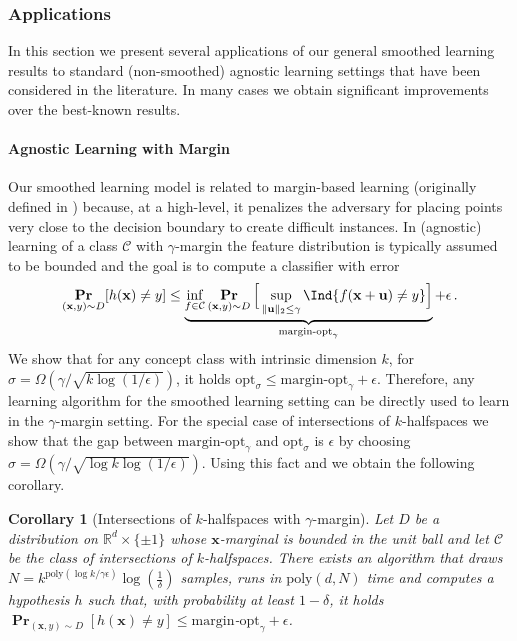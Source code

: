 \documentclass[10pt,a4paper]{article}
\newtheorem{corollary}{Corollary}[section]
\renewcommand\vec[1]{\mathbf{#1}}
\DeclareMathOperator*{\pr}{\mathbf{Pr}}
\newcommand{\R}{\mathbb{R}}
\newcommand{\eps}{\epsilon}
\newcommand{\poly}{\mathrm{poly}}
\newcommand{\1}{\Ind}
\newcommand{\smoothopt}{\mathrm{opt}_{\sigma}}
\newcommand{\x}{\vec x}
\begin{document}
\subsubsection{Applications}
In this section we present several applications of our general smoothed learning results to standard (non-smoothed) agnostic learning settings that have been considered in the literature. 
In many cases we obtain significant improvements over the best-known results.

\paragraph{Agnostic Learning with Margin}
Our smoothed learning model is related to margin-based learning (originally defined in \cite{BS00}) because, at a high-level, it
penalizes the adversary for placing points very close to the decision boundary to create
difficult instances.  In (agnostic) learning of a class $\mathcal C$ with $\gamma$-margin 
the feature distribution is typically assumed to be bounded and the goal is to compute a classifier with error 
\begin{equation}
\label{eq:margin-opt}
\pr_{(\x,y) \sim D}[h(\x) \neq y] \leq 
\underbrace{\inf_{f \in \mathcal C}\pr_{(\x,y) \sim D}\Big[\sup_{\|\vec u\|_2 \leq \gamma} \1\{f(\x + \vec u) \neq y\} \Big]}_{\text{margin-opt}_\gamma}
+ \eps\,.
\end{equation}
We show that for any concept class with intrinsic dimension $k$, for $\sigma = \Omega(\gamma/\sqrt{k \log(1/\eps)})$, it holds
$\smoothopt \leq \text{margin-opt}_\gamma + \eps$. Therefore, any learning algorithm for 
the smoothed learning setting can be directly used to learn in the $\gamma$-margin setting.
For the special case of intersections of $k$-halfspaces we show that the gap between
$\text{margin-opt}_{\gamma}$ and $\smoothopt$ is $\eps$ by choosing 
$\sigma = \Omega(\gamma/\sqrt{\log k \log(1/\eps)})$. Using this fact and  we obtain the following corollary.

\begin{corollary}[Intersections of $k$-halfspaces with $\gamma$-margin]
\label{inf:margin-intersections} 
Let $D$ be a distribution on $\R^d \times \{ \pm 1\}$ whose $\x$-marginal is bounded in the unit ball and let $\mathcal C$ be the class of intersections of $k$-halfspaces.
There exists an algorithm that draws $N = k^{\poly(\log k/\gamma \eps)}\log(\frac{1}{\delta})$ samples, runs in $\poly(d, N)$ time and computes a hypothesis $h$ such that, with probability at least $1-\delta$, 
it holds $\pr_{(\x,y)\sim D}[h(\x) \neq y] \leq \mathrm{margin}$-$\mathrm{opt}_\gamma + \eps$.
\end{corollary}
\end{document}
